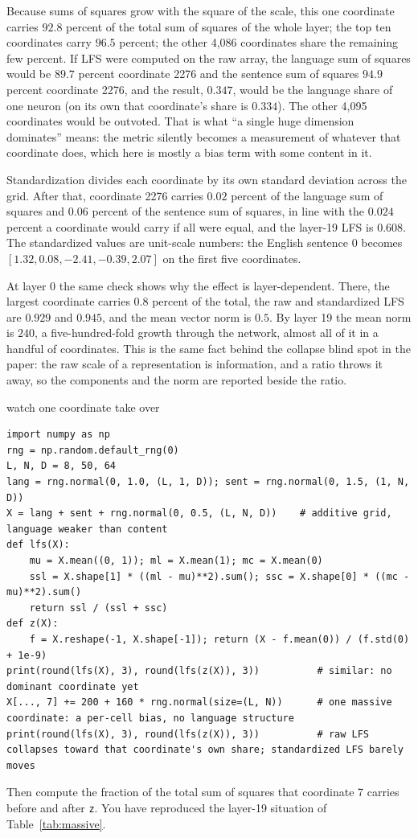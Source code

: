 Because sums of squares grow with the square of the scale, this one
coordinate carries $92.8$ percent of the total sum of squares of the whole
layer; the top ten coordinates carry $96.5$ percent; the other 4,086
coordinates share the remaining few percent. If LFS were computed on the raw
array, the language sum of squares would be $89.7$ percent coordinate 2276
and the sentence sum of squares $94.9$ percent coordinate 2276, and the
result, $0.347$, would be the language share of one neuron (on its own that
coordinate's share is $0.334$). The other 4,095 coordinates would be
outvoted. That is what ``a single huge dimension dominates'' means: the
metric silently becomes a measurement of whatever that coordinate does,
which here is mostly a bias term with some content in it.

Standardization divides each coordinate by its own standard deviation across
the grid. After that, coordinate 2276 carries $0.02$ percent of the language
sum of squares and $0.06$ percent of the sentence sum of squares, in line
with the $0.024$ percent a coordinate would carry if all were equal, and the
layer-19 LFS is $0.608$. The standardized values are unit-scale numbers: the
English sentence 0 becomes $[1.32, 0.08, -2.41, -0.39, 2.07]$ on the first
five coordinates.

At layer 0 the same check shows why the effect is layer-dependent. There, the
largest coordinate carries $0.8$ percent of the total, the raw and
standardized LFS are $0.929$ and $0.945$, and the mean vector norm is $0.5$.
By layer 19 the mean norm is $240$, a five-hundred-fold growth through the
network, almost all of it in a handful of coordinates. This is the same fact
behind the collapse blind spot in the paper: the raw scale of a
representation is information, and a ratio throws it away, so the components
and the norm are reported beside the ratio.

\begin{exercise}{watch one coordinate take over}
\begin{lstlisting}
import numpy as np
rng = np.random.default_rng(0)
L, N, D = 8, 50, 64
lang = rng.normal(0, 1.0, (L, 1, D)); sent = rng.normal(0, 1.5, (1, N, D))
X = lang + sent + rng.normal(0, 0.5, (L, N, D))    # additive grid, language weaker than content
def lfs(X):
    mu = X.mean((0, 1)); ml = X.mean(1); mc = X.mean(0)
    ssl = X.shape[1] * ((ml - mu)**2).sum(); ssc = X.shape[0] * ((mc - mu)**2).sum()
    return ssl / (ssl + ssc)
def z(X):
    f = X.reshape(-1, X.shape[-1]); return (X - f.mean(0)) / (f.std(0) + 1e-9)
print(round(lfs(X), 3), round(lfs(z(X)), 3))          # similar: no dominant coordinate yet
X[..., 7] += 200 + 160 * rng.normal(size=(L, N))      # one massive coordinate: a per-cell bias, no language structure
print(round(lfs(X), 3), round(lfs(z(X)), 3))          # raw LFS collapses toward that coordinate's own share; standardized LFS barely moves
\end{lstlisting}
Then compute the fraction of the total sum of squares that coordinate 7
carries before and after \texttt{z}. You have reproduced the layer-19
situation of Table~\ref{tab:massive}.
\end{exercise}

